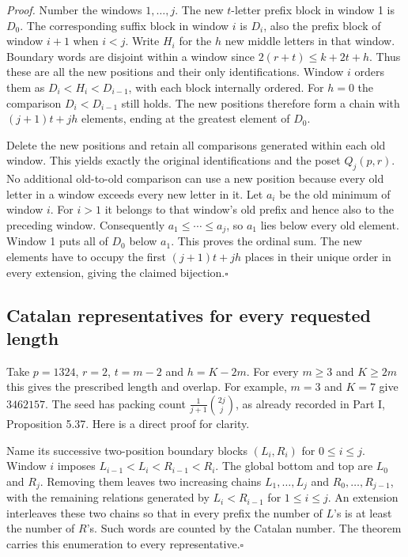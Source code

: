 \documentclass[11pt]{article}
\newcommand{\done}{\hfill\(\square\)}
\begin{document}
\textit{Proof.} Number the windows $1,\ldots,j$. The new $t$-letter prefix block in window 1 is $D_0$. The corresponding suffix block in window $i$ is $D_i$, also the prefix block of window $i+1$ when $i<j$. Write $H_i$ for the $h$ new middle letters in that window. Boundary words are disjoint within a window since $2(r+t)\le k+2t+h$. Thus these are all the new positions and their only identifications. Window $i$ orders them as $D_i<H_i<D_{i-1}$, with each block internally ordered. For $h=0$ the comparison $D_i<D_{i-1}$ still holds. The new positions therefore form a chain with $(j+1)t+jh$ elements, ending at the greatest element of $D_0$.

Delete the new positions and retain all comparisons generated within each old window. This yields exactly the original identifications and the poset $Q_j(p,r)$. No additional old-to-old comparison can use a new position because every old letter in a window exceeds every new letter in it. Let $a_i$ be the old minimum of window $i$. For $i>1$ it belongs to that window's old prefix and hence also to the preceding window. Consequently $a_1\le\cdots\le a_j$, so $a_1$ lies below every old element. Window 1 puts all of $D_0$ below $a_1$. This proves the ordinal sum. The new elements have to occupy the first $(j+1)t+jh$ places in their unique order in every extension, giving the claimed bijection.\done

\subsection*{Catalan representatives for every requested length}
Take $p=1324$, $r=2$, $t=m-2$ and $h=K-2m$. For every $m\ge3$ and $K\ge2m$ this gives the prescribed length and overlap. For example, $m=3$ and $K=7$ give $3462157$. The seed has packing count $\frac1{j+1}\binom{2j}{j}$, as already recorded in Part I, Proposition 5.37. Here is a direct proof for clarity.

Name its successive two-position boundary blocks $(L_i,R_i)$ for $0\le i\le j$. Window $i$ imposes $L_{i-1}<L_i<R_{i-1}<R_i$. The global bottom and top are $L_0$ and $R_j$. Removing them leaves two increasing chains $L_1,\ldots,L_j$ and $R_0,\ldots,R_{j-1}$, with the remaining relations generated by $L_i<R_{i-1}$ for $1\le i\le j$. An extension interleaves these two chains so that in every prefix the number of $L$'s is at least the number of $R$'s. Such words are counted by the Catalan number. The theorem carries this enumeration to every representative.\done
\end{document}
